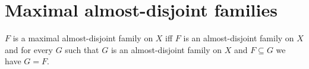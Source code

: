 \section{Maximal almost-disjoint families}








\begin{definition}\label{maximal_almost_disjoint_family_on}
    $F$ is a maximal almost-disjoint family on $X$ iff
        $F$ is an almost-disjoint family on $X$ and
        for every $G$ such that
            $G$ is an almost-disjoint family on $X$ and
            $F\subseteq G$
        we have $G=F$.
\end{definition}

